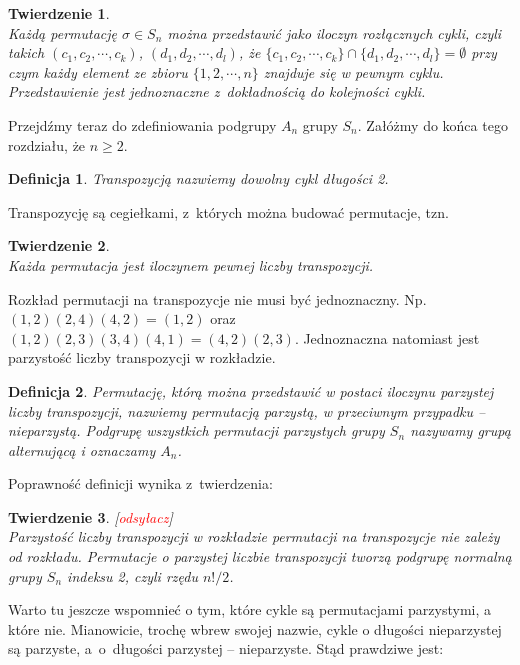 \documentclass[licencjacka]{pracamgr}
\newtheorem{deff}{Definicja}[section]
\newtheorem{thh}{Twierdzenie}[section]
\begin{document}
\begin{thh} $ $ \\
    Każdą permutację $\sigma \in S_n$ można przedstawić jako iloczyn rozłącznych cykli,
    czyli takich $(c_1, c_2, \cdots, c_k)$, $(d_1, d_2, \cdots, d_l)$, że $\{ c_1, c_2, \cdots, c_k \} \cap \{ d_1, d_2, \cdots, d_l \} = \emptyset$
    przy czym każdy element ze zbioru $\{1, 2, \cdots, n\}$ znajduje się w pewnym cyklu.
    Przedstawienie jest jednoznaczne z~dokładnością do kolejności cykli.
\end{thh}

\pagebreak[2]

Przejdźmy teraz do zdefiniowania podgrupy $A_n$ grupy $S_n$. Załóżmy
do końca tego rozdziału, że $n \ge 2$.

\begin{deff}
    \emph{Transpozycją} nazwiemy dowolny cykl długości 2.
\end{deff}

Transpozycję są cegiełkami, z~których można budować permutacje, tzn.

\begin{thh} $ $ \\
    Każda permutacja jest iloczynem pewnej liczby transpozycji.
\end{thh}

Rozkład permutacji na transpozycje nie musi być jednoznaczny. Np.
$(1, 2) (2, 4) (4, 2) = (1, 2)$ oraz $(1, 2) (2, 3) (3, 4) (4, 1) =
(4, 2) (2, 3)$. Jednoznaczna natomiast jest parzystość liczby
transpozycji w rozkładzie.

\begin{deff}
    Permutację, którą można przedstawić w postaci iloczynu parzystej liczby
    transpozycji, nazwiemy \emph{permutacją parzystą},
    w przeciwnym przypadku -- \emph{nieparzystą}.
    Podgrupę wszystkich permutacji parzystych grupy $S_n$ nazywamy \emph{grupą alternującą} i oznaczamy $A_n$.
\end{deff}


Poprawność definicji wynika z~twierdzenia:

\begin{thh}\label{thm_A_n} $ $[\textcolor{red}{odsyłacz}] \\
    Parzystość liczby transpozycji w rozkładzie permutacji na transpozycje nie zależy od rozkładu.
    Permutacje o parzystej liczbie transpozycji tworzą podgrupę normalną grupy $S_n$ indeksu 2, czyli
    rzędu $n!/2$.
\end{thh}

Warto tu jeszcze wspomnieć o tym, które cykle są permutacjami
parzystymi, a które nie. Mianowicie, trochę wbrew swojej nazwie,
cykle o długości nieparzystej są parzyste, a~o~długości parzystej --
nieparzyste. Stąd prawdziwe jest:
\end{document}
